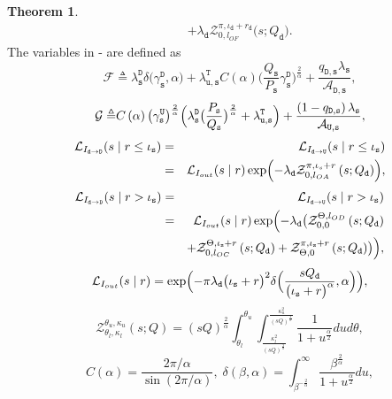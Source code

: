 \documentclass[twocolumn,english]{IEEEtran}
\theoremstyle{plain}
\theoremstyle{definition}
\newtheorem{theorem}{\textbf{Theorem}}
\begin{document}
\begin{theorem}
\begin{eqnarray}
 &  & +\lambda_{\mathtt{d}}\mathcal{Z}_{0,l_{OF}}^{\pi,\iota_{\mathtt{d}}+r_{\mathtt{d}}}\bigl(s;Q_{\mathtt{d}}\bigr).\label{eq:I_3}
\end{eqnarray}
The variables in -
are defined as
\[
\mathcal{F\triangleq}\lambda_{\mathtt{s}}^{\mathtt{D}}\delta\bigl(\gamma_{\mathtt{s}}^{\mathtt{D}},\alpha\bigr)+\lambda_{\mathtt{u,s}}^{\mathtt{T}}C\left(\alpha\right)\bigl(\frac{Q_{\mathtt{s}}}{P_{\mathtt{s}}}\gamma_{\mathtt{s}}^{\mathtt{D}}\bigr)^{\frac{2}{\alpha}}+\frac{q_{\mathtt{D,s}}\lambda_{\mathtt{s}}}{\mathcal{A}_{\mathtt{D,s}}},
\]
\[
\mathcal{G\triangleq}C\left(\alpha\right)\bigl(\gamma_{\mathtt{s}}^{\mathtt{U}}\bigr)^{\frac{2}{\alpha}}\Bigl(\lambda_{\mathtt{s}}^{\mathtt{D}}\bigl(\frac{P_{\mathtt{s}}}{Q_{\mathtt{s}}}\bigr)^{\frac{2}{\alpha}}+\lambda_{\mathtt{u,s}}^{\mathtt{T}}\Bigr)+\frac{\left(1-q_{\mathtt{D,s}}\right)\lambda_{\mathtt{s}}}{\mathcal{A}_{\mathtt{U,s}}},
\]
\begin{eqnarray*}
\mathcal{L}_{I_{\mathtt{d\rightarrow D}}}(s\mid r\leq\iota_{\mathtt{s}}) & = & \mathcal{L}_{I_{\mathtt{d\rightarrow U}}}(s\mid r\leq\iota_{\mathtt{s}})\\
 & = & \mathcal{L}_{I_{out}}(s\mid r)\exp\Bigl(-\lambda_{\mathtt{d}}\mathcal{Z}_{0,l_{OA}}^{\pi,\iota_{s}+r}\left(s;Q_{\mathtt{d}}\right)\Bigr),
\end{eqnarray*}
\begin{eqnarray*}
\mathcal{L}_{I_{\mathtt{d\rightarrow D}}}(s\mid r>\iota_{\mathtt{s}}) & = & \mathcal{L}_{I_{\mathtt{d\rightarrow U}}}(s\mid r>\iota_{\mathtt{s}})\\
 & = & \mathcal{L}_{I_{out}}(s\mid r)\exp\Bigl(-\lambda_{\mathtt{d}}\bigl(\mathcal{Z}_{0,0}^{\Theta,l_{OD}}\left(s;Q_{\mathtt{d}}\right)\\
 &  & +\mathcal{Z}_{0,l_{OC}}^{\Theta,\iota_{\mathtt{s}}+r}\left(s;Q_{\mathtt{d}}\right)+\mathcal{Z}_{\Theta,0}^{\pi,\iota_{\mathtt{s}}+r}\left(s;Q_{\mathtt{d}}\right)\bigr)\Bigr),
\end{eqnarray*}
\[
\mathcal{L}_{I_{out}}(s\mid r)=\exp\Bigl(-\pi\lambda_{\mathtt{d}}\bigl(\iota_{\mathtt{s}}+r\bigr)^{2}\delta\Bigl(\frac{sQ_{\mathtt{d}}}{\bigl(\iota_{\mathtt{s}}+r\bigr)^{\alpha}},\alpha\Bigr)\Bigr),
\]
\[
\mathcal{Z}_{\theta_{l},\kappa_{l}}^{\theta_{u},\kappa_{u}}\left(s;Q\right)=\left(sQ\right)^{\frac{2}{\alpha}}\int_{\theta_{l}}^{\theta_{u}}\int_{\frac{\kappa_{l}^{2}}{(sQ)^{\frac{2}{\alpha}}}}^{\frac{\kappa_{u}^{2}}{\left(sQ\right)^{\frac{2}{\alpha}}}}\frac{1}{1+u^{\frac{\alpha}{2}}}dud\theta,
\]
{\small{}
\[
C\left(\alpha\right)=\frac{2\pi/\alpha}{\sin\left(2\pi/\alpha\right)},\;\delta\left(\beta,\alpha\right)=\int_{\beta^{-\frac{2}{\alpha}}}^{\infty}\frac{\beta^{\frac{2}{\alpha}}}{1+u^{\frac{\alpha}{2}}}du,
\]}
\end{theorem}
\end{document}
